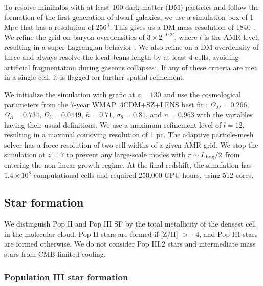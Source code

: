 \documentclass[apj]{emulateapj}
\begin{document}
To resolve minihalos with at least 100 dark matter (DM) particles and
follow the formation of the first generation of dwarf galaxies, we use
a simulation box of 1 Mpc that has a resolution of $256^3$.  This
gives us a DM mass resolution of 1840 \Ms.  We refine the grid on
baryon overdensities of $3 \times 2^{-0.2l}$, where $l$ is the AMR
level, resulting in a super-Lagrangian behavior \citep[also
  see][]{OShea08}.  We also refine on a DM overdensity of three and
always resolve the local Jeans length by at least 4 cells, avoiding
artificial fragmentation during gaseous collapses \citep{Truelove97}.
If any of these criteria are met in a single cell, it is flagged for
further spatial refinement.

We initialize the simulation with grafic \citep{Bertschinger01} at $z
= 130$ and use the cosmological parameters from the 7-year WMAP
$\Lambda$CDM+SZ+LENS best fit \citep{WMAP7}: $\Omega_M = 0.266$,
$\Omega_\Lambda = 0.734$, $\Omega_b = 0.0449$, $h = 0.71$, $\sigma_8 =
0.81$, and $n = 0.963$ with the variables having their usual
definitions.  We use a maximum refinement level of $l = 12$, resulting
in a maximal comoving resolution of 1 pc.  The adaptive particle-mesh
solver has a force resolution of two cell widths of a given AMR grid.
We stop the simulation at $z=7$ to prevent any large-scale modes with
$r \sim L_{\rm box}/2$ from entering the non-linear growth regime.  At
the final redshift, the simulation has $1.4 \times 10^8$ computational
cells and required 250,000 CPU hours, using 512 cores.

\subsection{Star formation}

We distinguish Pop II and Pop III SF by the total metallicity of the
densest cell in the molecular cloud.  Pop II stars are formed if [Z/H]
$> -4$, and Pop III stars are formed otherwise.  We do not consider
Pop III.2 stars and intermediate mass stars from CMB-limited cooling.

\subsubsection{Population III star formation}
\end{document}
